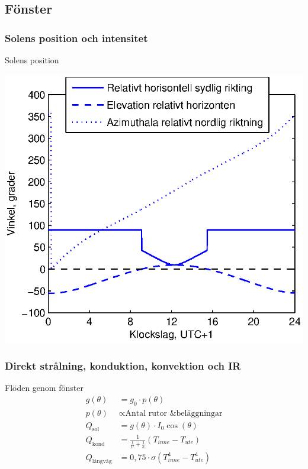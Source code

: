 \subsection{Fönster}

\subsubsection{Solens position och intensitet}
\begin{frame}{Solens position}
  \begin{center}
  \includegraphics[scale=0.8]{images/sunposition1231.eps}
  \end{center}
\end{frame}

\subsubsection{Direkt strålning, konduktion, konvektion och IR}
\begin{frame}{Flöden genom fönster}
  \begin{align*}
    g\left( \theta \right) & = g_0 \cdot p\left( \theta \right)\\[10pt]
    p\left( \theta \right) & \propto \text{Antal rutor \& beläggningar}\\[10pt]
    Q_{\text{sol}} \,\,\,\, & = g\left( \theta \right) \cdot I_0 \cos{\left( \theta \right)}\\[10pt]
    Q_{\text{kond}} & = \frac{1}{\frac{1}{U}+\frac{1}{h}} \left( T_{inne} - T_{ute}\right)\\[10pt]
    Q_{\text{långvåg}} & = 0,75 \cdot \sigma \left( T_{inne}^4 - T_{ute}^4\right)
  \end{align*}
\end{frame}

